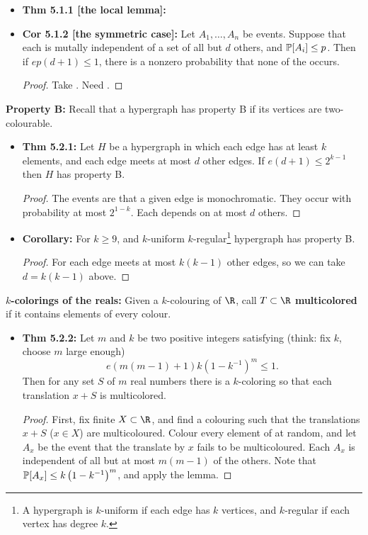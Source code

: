 \documentclass[11pt]{article}
\newenvironment{INT}[1][]{\begin{itemize}\small\item\textbf{#1}}{\end{itemize}}
\newcommand{\moreINT}[1][]{\item\textbf{#1}}
\begin{document}
\begin{chapter5}
\begin{itemise}
\begin{INT}[Thm 5.1.1 {[the local lemma]}:]
\moreINT[Cor 5.1.2 {[the symmetric case]}:]
Let $A_1,\ldots,A_n$ be events. Suppose that each is mutally independent of a set of all but $d$ others, and $\operatorname{\mathbb{P}}[A_i]\leq p$. Then if $ep(d+1)\leq 1$, there is a nonzero probability that none of the  occurs.
\begin{proof}
Take . Need .
\end{proof}
\end{INT}
\item \textbf{Property B:} Recall that a hypergraph has property B if its vertices are two-colourable.
\begin{INT}[Thm 5.2.1:]
Let $H$ be a hypergraph in which each edge has at least $k$ elements, and each edge meets at most $d$ other edges. If $e(d+1)\leq2^{k-1}$ then $H$ has property B.
\begin{proof}
The events are that a given edge is monochromatic. They occur with probability at most $2^{1-k}$. Each depends on at most $d$ others.
\end{proof}
\moreINT[Corollary:] For $k\geq9$, and $k$-uniform $k$-regular\footnote{A hypergraph is $k$-uniform if each edge has $k$ vertices, and $k$-regular if each vertex has degree $k$.} hypergraph has property B.
\begin{proof}
For each edge meets at most $k(k-1)$ other edges, so we can take $d=k(k-1)$ above.
\end{proof}
\end{INT}
\item \textbf{$k$-colorings of the reals:} Given a $k$-colouring of $\R$, call $T\subset\R$ \textbf{multicolored} if it contains elements of every colour.
\begin{INT}[Thm 5.2.2:]
Let $m$ and $k$ be two positive integers satisfying (think: fix $k$, choose $m$ large enough)
\[e(m(m-1)+1)k\left(1-k^{-1}\right)^m\leq1.\]
Then for any set $S$ of $m$ real numbers there is a $k$-coloring so that each translation $x+S$ is multicolored.
\begin{proof}
First, fix finite $X\subset\R$, and find a colouring such that the translations $x+S$ ($x\in X$) are multicoloured. Colour every element of  at random, and let $A_x$ be the event that the translate by $x$ fails to be multicoloured. Each $A_x$ is independent of all but at most $m(m-1)$ of the others. Note that $\operatorname{\mathbb{P}}[A_x]\leq k\left(1-k^{-1}\right)^m$, and apply the lemma.


\end{proof}
\end{INT}
\end{itemise}
\end{chapter5}
\end{document}
